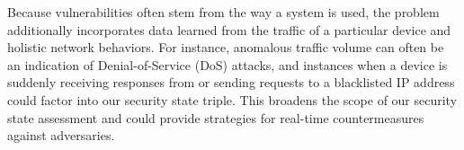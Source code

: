 Because vulnerabilities often stem from the way a system is used, the problem additionally incorporates data learned from the traffic of a particular device and holistic network behaviors. For instance, anomalous traffic volume can often be an indication of Denial-of-Service (DoS) attacks, and instances when a device is suddenly receiving responses from or sending requests to a blacklisted IP address could factor into our security state triple. This broadens the scope of our security state assessment and could provide strategies for real-time countermeasures against adversaries.










